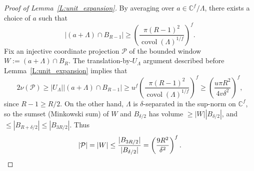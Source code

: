 \documentclass[10pt,a4paper]{amsart}
\newcommand{\C}{\mathbb{C}}
\newcommand{\covol}{\on{covol}}
\newcommand{\on}{\operatorname}
\begin{document}
\begin{proof}[Proof of Lemma~\ref{L:unit_expansion}]
By averaging over $a\in \C^f/\Lambda$, there exists a choice of $a$ such that
\begin{equation*}
|(a+\Lambda)\cap B_{R-1}|
\ge \left(\frac{\pi (R-1)^2}{\covol(\Lambda)^{1/f}}\right)^f.
\end{equation*}
Fix an injective coordinate projection $\mathcal{P}$
of the bounded window $W := (a+\Lambda)\cap B_R$.
The translation-by-$U_\Lambda$ argument
described before Lemma~\ref{L:unit_expansion} implies that
\begin{equation*}
2\nu(\mathcal{P}) \ge |U_\Lambda||(a+\Lambda)\cap B_{R-1}|
\ge u^f \left(\frac{\pi (R-1)^2}{\covol(\Lambda)^{1/f}}\right)^f
\ge \left(\frac{u \pi R^2}{4v\delta^{2}}\right)^f,
\end{equation*}
since $R-1 \ge R/2$.
On the other hand, $\Lambda$ is $\delta$-separated
in the sup-norm on $\C^f$,
so the sumset (Minkowski sum) of $W$ and $B_{\delta/2}$
has volume $\ge |W| |B_{\delta/2}|$,
and $\le |B_{R+\delta/2}| \le |B_{3R/2}|$.
Thus
\begin{equation*}
|\mathcal{P}| = |W| \le \frac{|B_{3R/2}|}{|B_{\delta/2}|}
= \left(\frac{9R^2}{\delta^2}\right)^{f}. \qedhere
\end{equation*}
\end{proof}
\end{document}
